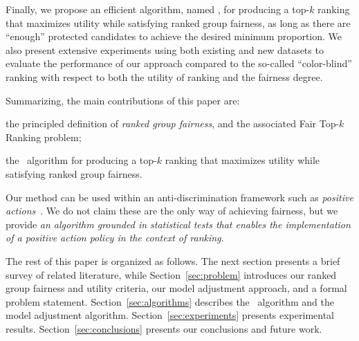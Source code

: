 Finally, we propose an efficient algorithm, named \algoFAIR, for producing a top-$k$ ranking that maximizes utility while satisfying ranked group fairness, as long as there are ``enough'' protected candidates to achieve the desired minimum proportion.
%
We also present extensive experiments using both existing and new datasets to evaluate the performance of our approach compared to the so-called ``color-blind'' ranking with respect to both the utility of ranking and the fairness degree.

Summarizing, the main contributions of this paper are:
\begin{compactenum}
	\item the principled definition of \emph{ranked group fairness}, and the associated  {\sc Fair Top-$k$ Ranking problem};
	\item the \algoFAIR\ algorithm for producing a top-$k$ ranking that maximizes utility while satisfying ranked group fairness.
\end{compactenum}

Our method can be used within an anti-discrimination framework such as \emph{positive actions}~\cite{sowell2005affirmative}. We do not claim these are the only way of achieving fairness, but we provide \emph{an algorithm grounded in statistical tests that enables the implementation of a positive action policy in the context of ranking}.

The rest of this paper is organized as follows.
%
The next section presents a brief survey of related literature, while Section~\ref{sec:problem} introduces our ranked group fairness and utility criteria, our model adjustment approach, and a formal problem statement.
%
Section~\ref{sec:algorithms} describes the \algoFAIR\ algorithm and the model adjustment algorithm.
%
Section~\ref{sec:experiments} presents experimental results.
%
Section~\ref{sec:conclusions} presents our conclusions and future work.

